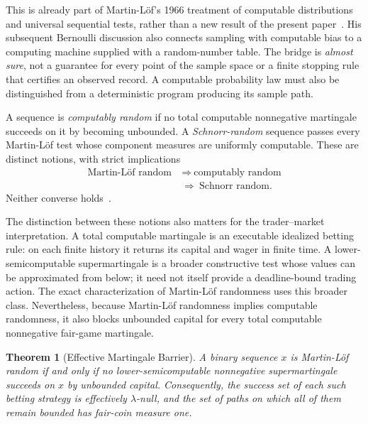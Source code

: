 \documentclass[aps,pra,reprint,superscriptaddress,amsmath,amssymb,floatfix]{revtex4-2}
\theoremstyle{plain}
\newtheorem{theorem}{Theorem}
\theoremstyle{definition}
\theoremstyle{remark}
\begin{document}
This is already part of Martin-L\"of's 1966 treatment of computable
distributions and universal sequential tests, rather than a new result of the
present paper~\cite[Sec.~IV, p.~614]{MartinLof1966}. His subsequent Bernoulli
discussion also connects sampling with computable bias to a computing machine
supplied with a random-number table. The bridge is \emph{almost sure}, not a
guarantee for every point of the sample space or a finite stopping rule that
certifies an observed record. A computable probability law must also be
distinguished from a deterministic program producing its sample path.

A sequence is \emph{computably random} if no total
computable nonnegative martingale succeeds on it by becoming unbounded. A
\emph{Schnorr-random} sequence passes every Martin-L\"of test whose component
measures are uniformly computable. These are distinct notions, with strict
implications
\begin{equation}
  \begin{aligned}
    \text{Martin-L\"of random}
      &\ \Longrightarrow\ \text{computably random}\\
      &\ \Longrightarrow\ \text{Schnorr random}.
  \end{aligned}
  \label{eq:randomhierarchy}
\end{equation}
Neither converse holds~\cite{schnorr1,Nies2009,DH}.

The distinction between these notions also matters for the trader--market
interpretation. A total computable martingale is an executable idealized
betting rule: on each finite history it returns its capital and wager in finite
time. A lower-semicomputable supermartingale is a broader constructive test
whose values can be approximated from below; it need not itself provide a
deadline-bound trading action. The exact characterization of Martin-L\"of
randomness uses this broader class. Nevertheless, because Martin-L\"of
randomness implies computable randomness, it also blocks unbounded capital for
every total computable nonnegative fair-game martingale.

\begin{theorem}[Effective Martingale Barrier]
  \label{thm:effective}
  A binary sequence \(x\) is Martin-L\"of random if and only if no
  lower-semicomputable nonnegative supermartingale succeeds on \(x\) by
  unbounded capital. Consequently, the success set of each such betting
  strategy is effectively \(\lambda\)-null, and the set of paths on which all
  of them remain bounded has fair-coin measure one.
\end{theorem}
\end{document}
